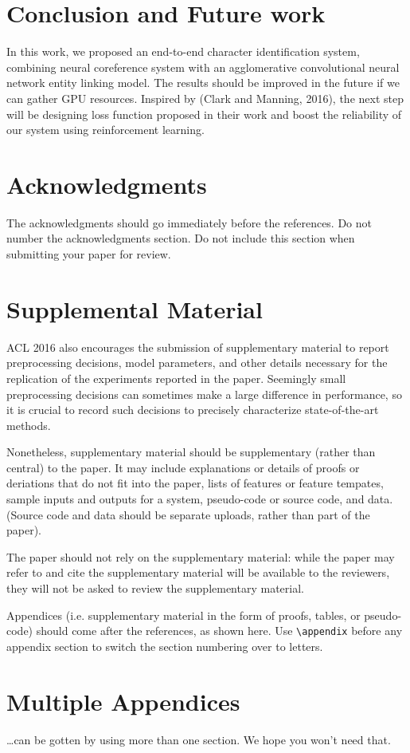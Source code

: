 \documentclass[11pt]{article}
\begin{document}
\section{Conclusion and Future work}

In this work, we proposed an end-to-end character identification system, combining neural coreference system with an agglomerative convolutional neural network entity linking model. The results should be improved in the future if we can gather GPU resources. Inspired by (Clark and Manning, 2016), the next step will be designing loss function proposed in their work and boost the reliability of our system using reinforcement learning.


\section*{Acknowledgments}

The acknowledgments should go immediately before the references.  Do
not number the acknowledgments section. Do not include this section
when submitting your paper for review.

%
%



\appendix

\section{Supplemental Material}
\label{sec:supplemental}
ACL 2016 also encourages the submission of supplementary material
to report preprocessing decisions, model parameters, and other details
necessary for the replication of the experiments reported in the 
paper. Seemingly small preprocessing decisions can sometimes make
a large difference in performance, so it is crucial to record such
decisions to precisely characterize state-of-the-art methods.

Nonetheless, supplementary material should be supplementary (rather
than central) to the paper. It may include explanations or details
of proofs or deriations that do not fit into the paper, lists of
features or feature tempates, sample inputs and outputs for a system,
pseudo-code or source code, and data. (Source code and data should
be separate uploads, rather than part of the paper).

The paper should not rely on the supplementary material: while the paper
may refer to and cite the supplementary material will be available to the
reviewers, they will not be asked to review the
supplementary material.

Appendices (i.e. supplementary material in the form of proofs, tables,
or pseudo-code) should come after the references, as shown here. Use
\verb|\appendix| before any appendix section to switch the section
numbering over to letters.

\section{Multiple Appendices}
\dots can be gotten by using more than one section. We hope you won't
need that.
\end{document}
